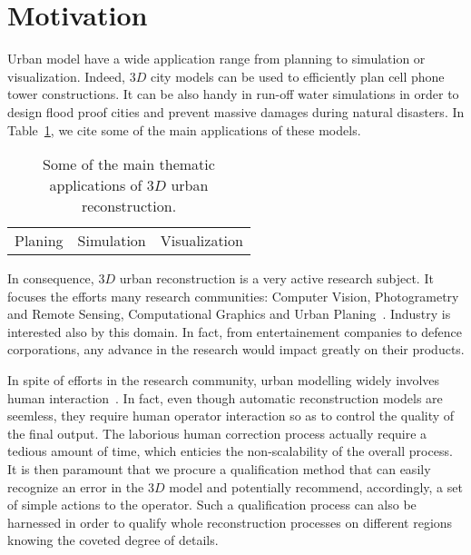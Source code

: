 \documentclass[../main.tex]{subfiles}
\begin{document}
    \section{Motivation}

    Urban model have a wide application range from planning to simulation or visualization. Indeed, $3D$ city models can be used to efficiently plan cell phone tower constructions. It can be also handy in run-off water simulations in order to design flood proof cities and prevent massive damages during natural disasters. In Table~\ref{tab::3d_applications}, we cite some of the main applications of these models.

    \begin{table}[H]
        \begin{center}
            \begin{tabular}{c c c}
                Planing & Simulation & Visualization\\
            \end{tabular}
            \caption{\label{tab::3d_applications} Some of the main thematic applications of $3D$ urban reconstruction\cite{Scholze2002}.}
        \end{center}
    \end{table}

    In consequence, $3D$ urban reconstruction is a very active research subject. It focuses the efforts many research communities: Computer Vision, Photogrametry and Remote Sensing, Computational Graphics and Urban Planing~\cite{Musialski2012}. Industry is interested also by this domain. In fact, from entertainement companies to defence corporations, any advance in the research would impact greatly on their products.

    In spite of efforts in the research community, urban modelling widely involves human interaction~\cite{Musialski2012}. In fact, even though automatic reconstruction models are seemless, they require human operator interaction so as to control the quality of the final output. The laborious human correction process actually require a tedious amount of time, which enticies the non-scalability of the overall process. It is then paramount that we procure a qualification method that can easily recognize an error in the $3D$ model and potentially recommend, accordingly, a set of simple actions to the operator. Such a qualification process can also be harnessed in order to qualify whole reconstruction processes on different regions knowing the coveted degree of details.
\end{document}
